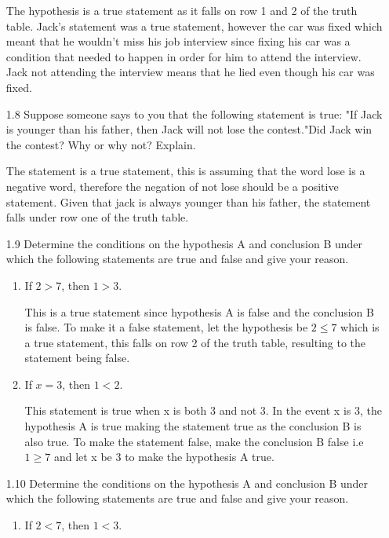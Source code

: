 \documentclass[11pt]{article}
\begin{document}
\begin{enumerate}
   \hspace{3em}The hypothesis is a true statement as it falls on row 1 and 2 of the truth table. Jack's statement was a true statement, however the car was fixed which meant that he wouldn't miss his job interview since fixing his car was a condition that needed to happen in order for him to attend the interview. Jack not attending the interview means that he lied even though his car was fixed.
   \item[1.8]Suppose someone says to you that the following statement is true: "If Jack is younger than his father, then Jack will not lose the contest."Did Jack win the contest? Why or why not? Explain.\par 
   \hspace{3em} The statement is a true statement, this is assuming that the word lose is a negative word, therefore the negation of not lose should be a positive statement. Given that jack is always younger than his father, the statement falls under row one of the truth table.
   \item[1.9]Determine the conditions on the hypothesis A and conclusion B under which the following statements are true and false and give your reason.\par 
   \begin{enumerate}
   \item If $2 > 7$, then $1 > 3$.\par 
   This is a true statement since hypothesis A is false and the conclusion B is false. To make it a false statement, let the hypothesis be $2 \leq 7$ which is a true statement, this falls on row 2 of the truth table, resulting to the statement being false.
   \item If $x = 3$, then $1 < 2$.\par 
   This statement is true when x is both 3 and not 3. In the event x is 3, the hypothesis A is true making the statement true as the conclusion B is also true. To make the statement false, make the conclusion B false i.e $1 \geq 7$ and let x be 3 to make the hypothesis A true.\par
   \end{enumerate}
   \item[1.10]Determine the conditions on the hypothesis A and conclusion B under which the following statements are true and false and give your reason.\par 
   \begin{enumerate}
   \item If $2 < 7$, then $1 < 3$.\par 

\end{enumerate}
\end{enumerate}
\end{document}
